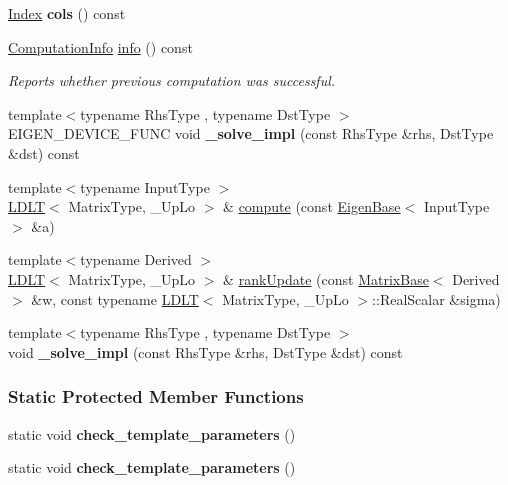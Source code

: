 \begin{DoxyCompactItemize}
\hyperlink{group___cholesky___module_ad9c57eb2fb3bbccd51b9d2e111bea355}{Index} {\bfseries cols} () const
\item 
\hyperlink{group__enums_ga85fad7b87587764e5cf6b513a9e0ee5e}{Computation\+Info} \hyperlink{group___cholesky___module_a6bd6008501a537d2e16ea672a853bf3e}{info} () const
\begin{DoxyCompactList}\small\item\em Reports whether previous computation was successful. \end{DoxyCompactList}\item 
\mbox{\label{group___cholesky___module_aa885aa88ba1781f14c96ebb0a581a5e0}} 
{\footnotesize template$<$typename Rhs\+Type , typename Dst\+Type $>$ }\\E\+I\+G\+E\+N\+\_\+\+D\+E\+V\+I\+C\+E\+\_\+\+F\+U\+NC void {\bfseries \+\_\+solve\+\_\+impl} (const Rhs\+Type \&rhs, Dst\+Type \&dst) const
\item 
{\footnotesize template$<$typename Input\+Type $>$ }\\\hyperlink{group___cholesky___module_class_eigen_1_1_l_d_l_t}{L\+D\+LT}$<$ Matrix\+Type, \+\_\+\+Up\+Lo $>$ \& \hyperlink{group___cholesky___module_ad1074d10072cf19437c6428c478fe5d6}{compute} (const \hyperlink{group___core___module_struct_eigen_1_1_eigen_base}{Eigen\+Base}$<$ Input\+Type $>$ \&a)
\item 
{\footnotesize template$<$typename Derived $>$ }\\\hyperlink{group___cholesky___module_class_eigen_1_1_l_d_l_t}{L\+D\+LT}$<$ Matrix\+Type, \+\_\+\+Up\+Lo $>$ \& \hyperlink{group___cholesky___module_a59a415ea2ba2d6208233da42f981579a}{rank\+Update} (const \hyperlink{group___core___module_class_eigen_1_1_matrix_base}{Matrix\+Base}$<$ Derived $>$ \&w, const typename \hyperlink{group___cholesky___module_class_eigen_1_1_l_d_l_t}{L\+D\+LT}$<$ Matrix\+Type, \+\_\+\+Up\+Lo $>$\+::Real\+Scalar \&sigma)
\item 
\mbox{\label{group___cholesky___module_a9d9481cd80eabbcfc4739530eb344712}} 
{\footnotesize template$<$typename Rhs\+Type , typename Dst\+Type $>$ }\\void {\bfseries \+\_\+solve\+\_\+impl} (const Rhs\+Type \&rhs, Dst\+Type \&dst) const
\end{DoxyCompactItemize}
\subsubsection*{Static Protected Member Functions}
\begin{DoxyCompactItemize}
\item 
\mbox{\label{group___cholesky___module_a711e8c7ef91a42a30f4be6df18c2fcc4}} 
static void {\bfseries check\+\_\+template\+\_\+parameters} ()
\item 
\mbox{\label{group___cholesky___module_a711e8c7ef91a42a30f4be6df18c2fcc4}} 
static void {\bfseries check\+\_\+template\+\_\+parameters} ()
\end{DoxyCompactItemize}
